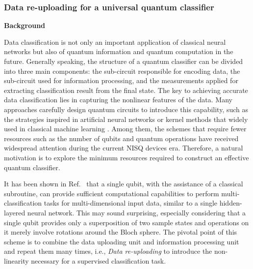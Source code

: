 
\subsubsection{Data re-uploading for a universal quantum classifier}
\textbf{Background}


Data classification is not only an important application of classical neural networks but also of quantum information and quantum computation in the future. Generally speaking, the structure of a quantum classifier can be divided into three main components: the sub-circuit responsible for encoding data, the sub-circuit used for information processing, and the measurements applied for extracting classification result from the final state. 
The key to achieving accurate data classification lies in capturing the nonlinear features of the data. Many approaches carefully design quantum circuits to introduce this capability, such as the strategies inspired in artificial neural networks or kernel methods that widely used in classical machine learning \cite{PhysRevLett.122.040504, 2019Supervised_nature, Wan_2017_npjqi, hur2022quantum, chalumuri2021hybrid, oh2020tutorial, farhi2018classification, wrobel2021application}. Among them, the schemes that require fewer resources such as the number of qubits and quantum operations have received widespread attention during the current NISQ devices era.
Therefore, a natural motivation is to explore the minimum resources required to construct an effective quantum classifier.

It has been shown in Ref.~\cite{PerezSalinas2020datareuploading} that a single qubit, with the assistance of a classical subroutine, can provide sufficient computational capabilities to perform multi-classification tasks for multi-dimensional input data, similar to a single hidden-layered neural network. This may sound surprising, especially considering that a single qubit provides only a superposition of two sample states and operations on it merely involve rotations around the Bloch sphere. 
The pivotal point of this scheme is to combine the data uploading unit and information processing unit and repeat them many times, i.e., \textit{Data re-uploading} to introduce the non-linearity necessary for a supervised classification task. 

